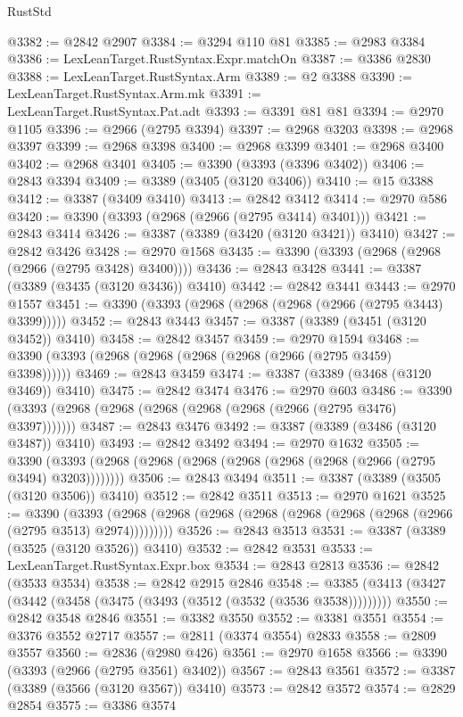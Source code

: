 \begin{lexlean}{RustStd}
\begin{coremodule}
{\begin{coremodule}
{{{{{{{{{{{{{{{{{{{{{{{{{{{{{{{{{@3382 := @2842 @2907
@3384 := @3294 @110 @81
@3385 := @2983 @3384
@3386 := LexLeanTarget.RustSyntax.Expr.matchOn
@3387 := @3386 @2830
@3388 := LexLeanTarget.RustSyntax.Arm
@3389 := @2 @3388
@3390 := LexLeanTarget.RustSyntax.Arm.mk
@3391 := LexLeanTarget.RustSyntax.Pat.adt
@3393 := @3391 @81 @81
@3394 := @2970 @1105
@3396 := @2966 (@2795 @3394)
@3397 := @2968 @3203
@3398 := @2968 @3397
@3399 := @2968 @3398
@3400 := @2968 @3399
@3401 := @2968 @3400
@3402 := @2968 @3401
@3405 := @3390 (@3393 (@3396 @3402))
@3406 := @2843 @3394
@3409 := @3389 (@3405 (@3120 @3406))
@3410 := @15 @3388
@3412 := @3387 (@3409 @3410)
@3413 := @2842 @3412
@3414 := @2970 @586
@3420 := @3390 (@3393 (@2968 (@2966 (@2795 @3414) @3401)))
@3421 := @2843 @3414
@3426 := @3387 (@3389 (@3420 (@3120 @3421)) @3410)
@3427 := @2842 @3426
@3428 := @2970 @1568
@3435 := @3390 (@3393 (@2968 (@2968 (@2966 (@2795 @3428) @3400))))
@3436 := @2843 @3428
@3441 := @3387 (@3389 (@3435 (@3120 @3436)) @3410)
@3442 := @2842 @3441
@3443 := @2970 @1557
@3451 := @3390 (@3393 (@2968 (@2968 (@2968 (@2966 (@2795 @3443) @3399)))))
@3452 := @2843 @3443
@3457 := @3387 (@3389 (@3451 (@3120 @3452)) @3410)
@3458 := @2842 @3457
@3459 := @2970 @1594
@3468 := @3390 (@3393 (@2968 (@2968 (@2968 (@2968 (@2966 (@2795 @3459) @3398))))))
@3469 := @2843 @3459
@3474 := @3387 (@3389 (@3468 (@3120 @3469)) @3410)
@3475 := @2842 @3474
@3476 := @2970 @603
@3486 := @3390 (@3393 (@2968 (@2968 (@2968 (@2968 (@2968 (@2966 (@2795 @3476) @3397)))))))
@3487 := @2843 @3476
@3492 := @3387 (@3389 (@3486 (@3120 @3487)) @3410)
@3493 := @2842 @3492
@3494 := @2970 @1632
@3505 := @3390 (@3393 (@2968 (@2968 (@2968 (@2968 (@2968 (@2968 (@2966 (@2795 @3494) @3203))))))))
@3506 := @2843 @3494
@3511 := @3387 (@3389 (@3505 (@3120 @3506)) @3410)
@3512 := @2842 @3511
@3513 := @2970 @1621
@3525 := @3390
    (@3393 (@2968 (@2968 (@2968 (@2968 (@2968 (@2968 (@2968 (@2966 (@2795 @3513) @2974)))))))))
@3526 := @2843 @3513
@3531 := @3387 (@3389 (@3525 (@3120 @3526)) @3410)
@3532 := @2842 @3531
@3533 := LexLeanTarget.RustSyntax.Expr.box
@3534 := @2843 @2813
@3536 := @2842 (@3533 @3534)
@3538 := @2842 @2915 @2846
@3548 := @3385 (@3413 (@3427 (@3442 (@3458 (@3475 (@3493 (@3512 (@3532 (@3536 @3538)))))))))
@3550 := @2842 @3548 @2846
@3551 := @3382 @3550
@3552 := @3381 @3551
@3554 := @3376 @3552 @2717
@3557 := @2811 (@3374 @3554) @2833
@3558 := @2809 @3557
@3560 := @2836 (@2980 @426)
@3561 := @2970 @1658
@3566 := @3390 (@3393 (@2966 (@2795 @3561) @3402))
@3567 := @2843 @3561
@3572 := @3387 (@3389 (@3566 (@3120 @3567)) @3410)
@3573 := @2842 @3572
@3574 := @2829 @2854
@3575 := @3386 @3574
}}}}}}}}}}}}}}}}}}}}}}}}}}}}}}}}}
\end{coremodule}}
\end{coremodule}
\end{lexlean}
